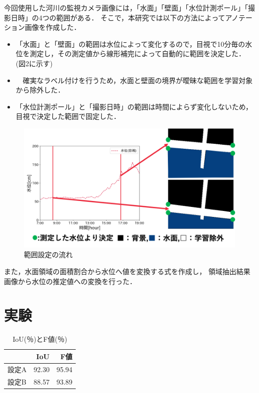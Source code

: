 \documentclass[a4j,twocolumn,10pt]{jarticle}
\begin{document}
今回使用した河川の監視カメラ画像には，「水面」「壁面」「水位計測ポール」「撮影日時」の4つの範囲がある．
そこで，本研究では以下の方法によってアノテーション画像を作成した．

\begin{itemize}
    \vspace{-3mm}
    \item 「水面」と「壁面」の範囲は水位によって変化するので，目視で10分毎の水位を測定し，その測定値から線形補完によって自動的に範囲を決定した．(図2に示す)
    \item　確実なラベル付けを行うため，水面と壁面の境界が曖昧な範囲を学習対象から除外した．
    \vspace{-1mm}
    \item 「水位計測ポール」と「撮影日時」の範囲は時間によらず変化しないため，目視で決定した範囲で固定した．
    \vspace{-3mm}
\end{itemize}


\begin{figure}[t]
    \centering
    \includegraphics[keepaspectratio,scale=0.45]{./figs/ano2.png}
    \vspace{-5mm}
    \caption{範囲設定の流れ}
    \vspace{-5mm}
    \label{images_range}
\end{figure}

また，水面領域の面積割合から水位へ値を変換する式を作成し，
領域抽出結果画像から水位の推定値への変換を行った．


\section{実験}

\begin{table}[b]
  \centering
  \begin{tabular}{lrr}
     &IoU&F値\\ \hline 
   設定A&92.30& 95.94\\ \hline  
   設定B&88.57&  93.89\\ \hline 
  \end{tabular}
  \vspace{-3mm}
  \caption{IoU(％)とF値(％)}
  \label{pole_AB}
\end{table}
\end{document}
